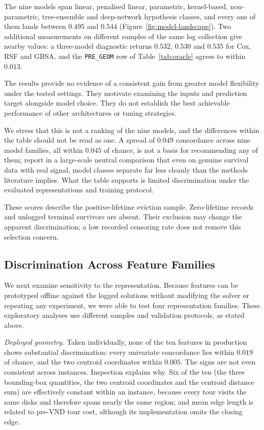 \documentclass[a4paper,fleqn]{cas-dc}
\begin{document}
The nine models span linear, penalised linear, parametric, kernel-based,
non-parametric, tree-ensemble and deep-network hypothesis classes, and every one
of them lands between $0.495$ and $0.544$ (Figure~\ref{fig:model-landscape}). Two additional measurements on
different samples of the same log collection give nearby values: a three-model
diagnostic returns $0.532$, $0.530$ and $0.535$ for Cox, RSF and GBSA, and the
\texttt{PRE\_GEOM} row of Table~\ref{tab:oracle} agrees to within $0.013$.

The results provide no evidence of a consistent gain from greater model
flexibility under the tested settings. They motivate examining the inputs and
prediction target alongside model choice. They do not establish the best
achievable performance of other architectures or tuning strategies.

We stress that this is not a ranking of the nine models, and the differences
within the table should not be read as one. A spread of $0.049$ concordance
across nine model families, all within $0.045$ of chance, is not a basis for
recommending any of them; \citet{burk2026neutral} report in a large-scale
neutral comparison that even on genuine survival data with real signal, model
classes separate far less cleanly than the methods literature implies. What the
table supports is limited discrimination under the evaluated representations and
training protocol.

These scores describe the positive-lifetime eviction sample. Zero-lifetime
records and unlogged terminal survivors are absent. Their exclusion may change
the apparent discrimination; a low recorded censoring rate does not remove this
selection concern.

\subsection{Discrimination Across Feature Families}\label{sec:diag-features}

We next examine sensitivity to the representation. Because
features can be prototyped offline against the logged solutions without
modifying the solver or repeating any experiment, we were able to test four
representation families. These exploratory analyses use different samples and
validation protocols, as stated above.

\emph{Deployed geometry.} Taken individually, none of the ten features in
production shows substantial discrimination: every univariate concordance lies within $0.019$ of
chance, and the two centroid coordinates within $0.005$. The signs are not even
consistent across instances. Inspection explains why. Six of the ten
(the three bounding-box quantities, the two centroid coordinates and the
centroid distance sum) are effectively constant within an instance, because
every tour visits the same disks and therefore spans nearly the same region;
and mean edge length is related to pre-VND tour cost, although its
implementation omits the closing edge.
\end{document}
